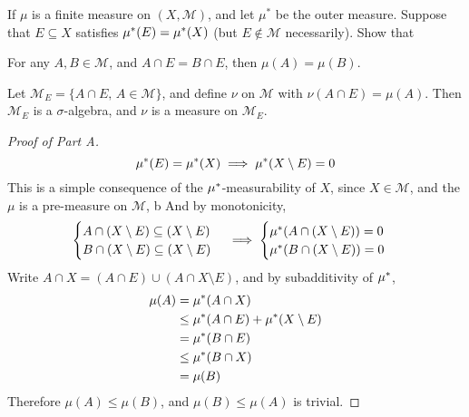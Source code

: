 \documentclass[../../main.tex]{subfiles}
\begin{document}
%

\newpage
{}
\begin{wts}
    If $\mu$ is a finite measure on $(X,\mathcal{M})$, and let $\mu^*$ be the outer measure. Suppose that $E\subseteq X$ satisfies $\mu^*(E)=\mu^*(X)$ (but $E\notin \mathcal{M}$ necessarily). Show that
    \begin{enumalpha}
        \item For any $A,B\in\mathcal{M}$, and $A\cap E = B\cap E$, then $\mu(A)=\mu(B)$.
        \item Let $\mathcal{M}_E=\{A\cap E,\,A\in\mathcal{M}\}$, and define $\nu$ on $\mathcal{M}$ with $\nu(A\cap E)=\mu(A)$. Then $\mathcal{M}_E$ is a $\sigma$-algebra, and $\nu$ is a measure on $\mathcal{M}_E$.
    \end{enumalpha}
\end{wts}
\begin{proof}[Proof of Part A]
\[
\mu^*(E)=\mu^*(X)\implies \mu^*(X\setminus E)=0
\]
This is a simple consequence of the $\mu^*$-measurability of $X$, since $X\in\mathcal{M}$, and the $\mu$ is a pre-measure on $\mathcal{M}$, b
And by monotonicity, 
\[
\begin{cases}A\cap (X\setminus E)\subseteq (X\setminus E)\\ B\cap (X\setminus E)\subseteq (X\setminus E)\end{cases}\implies\begin{cases}\mu^*(A\cap (X\setminus E))=0\\
\mu^*(B\cap (X\setminus E))=0\end{cases}
\]
Write $A\cap X = (A\cap E)\cup (A\cap X\setminus E)$, and by subadditivity of $\mu^*$,
\begin{align*}
\mu(A)&=\mu^*(A\cap X)\\
&\leq \mu^*(A\cap E)+\mu^*(X\setminus E)\\
&=\mu^*(B\cap E)\\
&\leq \mu^*(B\cap X)\\
&=\mu(B)
\end{align*}
Therefore $\mu(A)\leq \mu(B)$, and $\mu(B)\leq \mu(A)$ is trivial. 

\end{proof}
\end{document}
